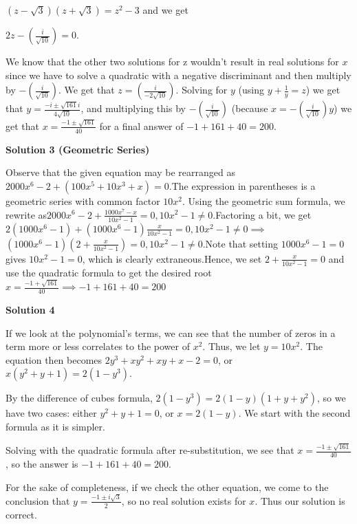 \begin{enumerate}
 $\left(z - \sqrt{3}\right)\left(z + \sqrt{3}\right) = z^2 - 3$ and we get 

 $2z - \left(\frac{i}{\sqrt{10}}\right) = 0$. 

 We know that the other two solutions for z wouldn't result in real solutions for $x$ since we have to solve a quadratic with a negative discriminant and then multiply by $-\left(\frac{i}{\sqrt{10}}\right)$. We get that $z = \left(\frac{i}{-2\sqrt{10}}\right)$. Solving for $y$ (using $y + \frac{1}{y} = z$) we get that $y = \frac{-i \pm \sqrt{161}i}{4\sqrt{10}}$, and multiplying this by $-\left(\frac{i}{\sqrt{10}}\right)$ (because $x = -\left(\frac{i}{\sqrt{10}}\right)y$) we get that $x = \frac{-1 \pm \sqrt{161}}{40}$ for a final answer of $-1 + 161 + 40 = \boxed{200}.$




\textbf{Solution 3 (Geometric Series)}

Observe that the given equation may be rearranged as$2000x^6-2+(100x^5+10x^3+x)=0$.The expression in parentheses is a geometric series with common factor $10x^2$. Using the geometric sum formula, we rewrite as$2000x^6-2+\frac{1000x^7-x}{10x^2-1}=0, 10x^2-1\neq0$.Factoring a bit, we get$2(1000x^6-1)+(1000x^6-1)\frac{x}{10x^2-1}=0, 10x^2-1\neq0 \implies$$(1000x^6-1)(2+\frac{x}{10x^2-1})=0, 10x^2-1\neq0$.Note that setting $1000x^6-1=0$ gives $10x^2-1=0$, which is clearly extraneous.Hence, we set $2+\frac{x}{10x^2-1}=0$ and use the quadratic formula to get the desired root$x=\frac{-1+\sqrt{161}}{40} \implies -1+161+40=\boxed{200}$




\textbf{Solution 4}

If we look at the polynomial's terms, we can see that the number of zeros in a term more or less correlates to the power of $x^2$. Thus, we let $y=10x^2$. The equation then becomes $2y^3+xy^2+xy+x-2=0$, or $x(y^2+y+1)=2(1-y^3)$.

 By the difference of cubes formula, $2(1-y^3)=2(1-y)(1+y+y^2)$, so we have two cases: either $y^2+y+1=0$, or $x=2(1-y)$. We start with the second formula as it is simpler.

 Solving with the quadratic formula after re-substitution, we see that $x=\frac{-1\pm\sqrt{161}}{40}$, so the answer is $-1+161+40=\boxed{200}$.

 For the sake of completeness, if we check the other equation, we come to the conclusion that $y=\frac{-1\pm i\sqrt{3}}{2}$, so no real solution exists for $x$. Thus our solution is correct.


\end{enumerate}
